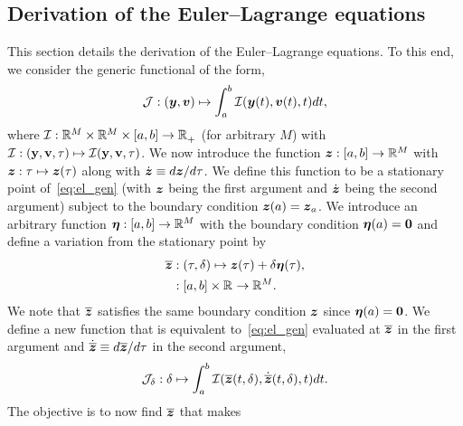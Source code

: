 \documentclass[3p,computermodern,10pt]{elsarticle}
\begin{document}
\begin{appendices}
\section{Derivation of the Euler--Lagrange equations}\label{appendix:eulerlagrange}
This section details the derivation of the Euler--Lagrange equations. To this end, we consider the generic functional of the form,
\begin{equation}\label{eq:el_gen}
\mathcal{J}: (\boldsymbol y,{\boldsymbol v}) \mapsto  \int_a^b \mathcal{I}(\boldsymbol y(t),{\boldsymbol v}(t),t)  dt,
\end{equation}
where $\mathcal{I}: \mathbb{R}^{M}  \times \mathbb{R}^{M}  \times[a,b] \rightarrow  \mathbb{R}^{}_{+}$
	(for arbitrary $M$) with $\mathcal{I}:
	(\mathbf{y},\mathbf{{v}},\tau) \mapsto
	\mathcal{I}(\mathbf{y},\mathbf{{v}},\tau)$. We now introduce
	the function $\boldsymbol z: [a,b] \rightarrow \mathbb{R}^{M}$ with $\boldsymbol z: \tau \mapsto \boldsymbol z(\tau)$ along with $\dot{\boldsymbol z} \equiv d \boldsymbol z /d\tau$. We define this function to be a stationary point of~\eqref{eq:el_gen} (with $\boldsymbol z$ being the first argument and $\dot{\boldsymbol z}$ being the second argument) subject to the boundary condition
	$\boldsymbol z(a) = \boldsymbol z_a$.  
We introduce an arbitrary function $\boldsymbol \eta : [a,b] \rightarrow \mathbb{R}^{M}$
with the boundary condition $\boldsymbol \eta(a) = \boldsymbol 0$ and define a variation
from the stationary point by
\begin{align*}
\overline{\boldsymbol z}  &: (\tau,\delta) \mapsto \boldsymbol z(\tau) + \delta \boldsymbol \eta(\tau),\\
&: [a,b] \times \mathbb{R}^{} \rightarrow \mathbb{R}^{M}.
\end{align*}
We note that $\overline{\boldsymbol z}$ satisfies the same boundary condition $\boldsymbol z$ since $\boldsymbol \eta(a) = \boldsymbol 0$.
We define a new function that is equivalent to~\eqref{eq:el_gen} evaluated at $\overline{\boldsymbol z}$ in the first argument and 
$\dot{\overline{\boldsymbol z}} \equiv d\overline{\boldsymbol z} / d\tau$ in the second argument,
$$
\mathcal{J}_{\delta}: \delta \mapsto \int_a^b \mathcal{I}(\overline{\boldsymbol z}(t,\delta),\dot{\overline{\boldsymbol z}}(t,\delta) ,t)  dt.
$$
The objective is to now find $\overline{\boldsymbol z}$ that makes

\end{appendices}
\end{document}
